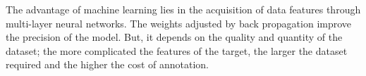 The advantage of machine learning lies in the acquisition of data features through multi-layer neural networks. The weights adjusted by back propagation improve the precision of the model. But, it depends on the quality and quantity of the dataset; the more complicated the features of the target, the larger the dataset required and the higher the cost of annotation. 